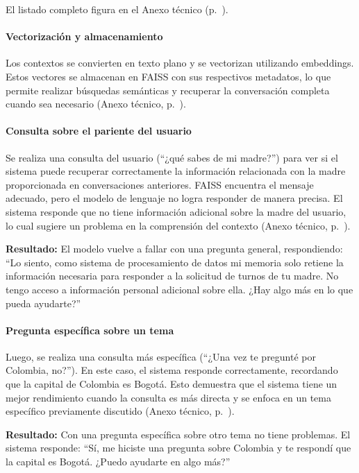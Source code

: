 El listado completo figura en el Anexo técnico (p.~\pageref{anexo:code-4-1-7-2}).

\paragraph{Vectorización y almacenamiento}

Los contextos se convierten en texto plano y se vectorizan utilizando embeddings. Estos vectores se almacenan en FAISS con sus respectivos metadatos, lo que permite realizar búsquedas semánticas y recuperar la conversación completa cuando sea necesario (Anexo técnico, p.~\pageref{anexo:code-4-1-7-3}).

\paragraph{Consulta sobre el pariente del usuario}

Se realiza una consulta del usuario (``¿qué sabes de mi madre?'') para ver si el sistema puede recuperar correctamente la información relacionada con la madre proporcionada en conversaciones anteriores. FAISS encuentra el mensaje adecuado, pero el modelo de lenguaje no logra responder de manera precisa. El sistema responde que no tiene información adicional sobre la madre del usuario, lo cual sugiere un problema en la comprensión del contexto (Anexo técnico, p.~\pageref{anexo:code-4-1-7-4}).

\textbf{Resultado:} El modelo vuelve a fallar con una pregunta general, respondiendo: ``Lo siento, como sistema de procesamiento de datos mi memoria solo retiene la información necesaria para responder a la solicitud de turnos de tu madre. No tengo acceso a información personal adicional sobre ella. ¿Hay algo más en lo que pueda ayudarte?''

\paragraph{Pregunta específica sobre un tema}

Luego, se realiza una consulta más específica (``¿Una vez te pregunté por Colombia, no?''). En este caso, el sistema responde correctamente, recordando que la capital de Colombia es Bogotá. Esto demuestra que el sistema tiene un mejor rendimiento cuando la consulta es más directa y se enfoca en un tema específico previamente discutido (Anexo técnico, p.~\pageref{anexo:code-4-1-7-5}).

\textbf{Resultado:} Con una pregunta específica sobre otro tema no tiene problemas. El sistema responde: ``Sí, me hiciste una pregunta sobre Colombia y te respondí que la capital es Bogotá. ¿Puedo ayudarte en algo más?''

